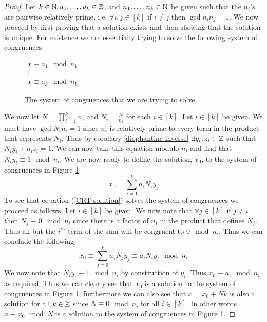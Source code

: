         \begin{proof}
            Let $k \in \mathbb{N}, a_1, \dots, a_k \in \mathbb{Z}$, and $n_1, \dots, n_k \in \mathbb{N}$ 
            be given such that the $n_i$'s are pairwise relatively prime, i.e. $\forall i, j \in [k]$
            if $i \neq j$ then $\gcd{n_i}{n_j} = 1$. We now proceed by first proving that a 
            solution exists and then showing that the solution is unique. For existence we
            are essentially trying to solve the following system of congruences. 
            \begin{figure}[H]
                \centering
                $\begin{array}{c}
                    x \equiv a_1 \mod n_1 \\
                    \vdots \\
                    x \equiv a_k \mod n_k
                \end{array}$
                \caption{The system of congruences that we are trying to solve.}
                \label{CRT congruences}
            \end{figure}
            We now let $N = \prod_{i = 1}^{k} n_i$ and $N_i = \frac{N}{n_i}$ for each $i \in [k]$. 
            Let $i \in [k]$ be given. We must have $\gcd{N_i}{n_i} = 1$ since $n_i$ is relatively
            prime to every term in the product that represents $N_i$. Thus by corollary 
            \ref{diophantine inverse} $\exists y_i, z_i \in \mathbb{Z}$ such that
            $N_iy_i + n_iz_i = 1$. We can now take this equation modulo $n_i$ and 
            find that $N_iy_i \equiv 1 \mod n_i$. We are now ready to define the solution, $x_0$,
            to the system of congruences in Figure \ref{CRT congruences}.
            \begin{equation}
                x_0 = \sum_{i = 1}^{k} a_iN_iy_i
                \label{CRT solution}
            \end{equation}
            To see that equation (\ref{CRT solution}) solves the system of congruences we proceed
            as follows. Let $i \in [k]$ be given. We now note that $\forall j \in [k]$ if
            $j \neq i$ then $N_j \equiv 0 \mod n_i$ since there is a factor of $n_i$ in the product
            that defines $N_j$. Thus all but the $i^{th}$ term of the sum will be congruent to $0
            \mod n_i$. Thus we can conclude the following
            \[
                x_0 \equiv \sum_{j = 0}^{k} a_jN_jy_j \equiv a_iN_iy_i\mod n_i
            \]
            We now note that $N_iy_i \equiv 1 \mod n_i$ by
            construction of $y_i$. Thus $x_0 \equiv a_i \mod n_i$ as required. Thus we can
            clearly see that $x_0$ is a solution to the system of congruences
            in Figure \ref{CRT congruences}; furthermore we can also see that
            $x = x_0 + Nk$ is also a solution for all $k \in \mathbb{Z}$ since $N \equiv 0 \mod n_i$
            for all $i \in [k]$.
            In other words $x \equiv x_0 \mod N$ is a solution to the system of
            congruences in Figure \ref{CRT congruences}.


\end{proof}

